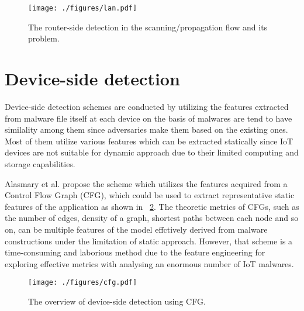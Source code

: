 \begin{figure}[h]
 \centering
 \texttt{[image: ./figures/lan.pdf]}
 \caption{The router-side detection in the scanning/propagation flow and its problem.} 
 \label{fig:lan}
\end{figure}

\section{Device-side detection} 
Device-side detection schemes are conducted by utilizing the features extracted from malware file itself at each device on the basis of malwares are tend to have similality among them since adversaries make them based on the existing ones.
Most of them utilize various features which can be extracted statically since IoT devices are not suitable for dynamic approach due to their limited computing and storage capabilities.

Alasmary et al. \cite{cfg} propose the scheme which utilizes the features acquired from a Control Flow Graph (CFG), which could be used to extract representative static features of the application as shown in \figurename~\ref{fig:cfg}.
The theoretic metrics of CFGs, such as the number of edges, density of a graph, shortest paths between each node and so on, can be multiple features of the model effctively derived from malware constructions under the limitation of static approach.
However, that scheme is a time-consuming and laborious method due to the feature engineering for exploring effective metrics with analysing an enormous number of IoT malwares.

\begin{figure}[h]
 \centering
 \texttt{[image: ./figures/cfg.pdf]}
 \caption{The overview of device-side detection using CFG.} 
 \label{fig:cfg}
\end{figure}
\afterpage{\clearpage}
\newpage
\newpage

